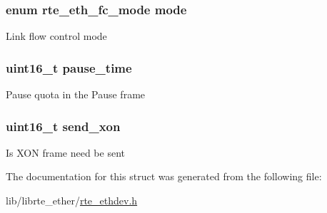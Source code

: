 \subsubsection[{mode}]{\setlength{\rightskip}{0pt plus 5cm}enum {\bf rte\+\_\+eth\+\_\+fc\+\_\+mode} mode}\label{structrte__eth__fc__conf_a442a0de0c0746fb498cb5b46772e2707}
Link flow control mode \hypertarget{structrte__eth__fc__conf_a9c5843ca5d190bd3dd3ae334bc7387e7}{}
\subsubsection[{pause\+\_\+time}]{\setlength{\rightskip}{0pt plus 5cm}uint16\+\_\+t pause\+\_\+time}\label{structrte__eth__fc__conf_a9c5843ca5d190bd3dd3ae334bc7387e7}
Pause quota in the Pause frame \hypertarget{structrte__eth__fc__conf_a2a3dce6291881ac9be7fb969ee0b67a7}{}
\subsubsection[{send\+\_\+xon}]{\setlength{\rightskip}{0pt plus 5cm}uint16\+\_\+t send\+\_\+xon}\label{structrte__eth__fc__conf_a2a3dce6291881ac9be7fb969ee0b67a7}
Is X\+O\+N frame need be sent 

The documentation for this struct was generated from the following file\+:\begin{DoxyCompactItemize}
\item 
lib/librte\+\_\+ether/\hyperlink{rte__ethdev_8h}{rte\+\_\+ethdev.\+h}\end{DoxyCompactItemize}
